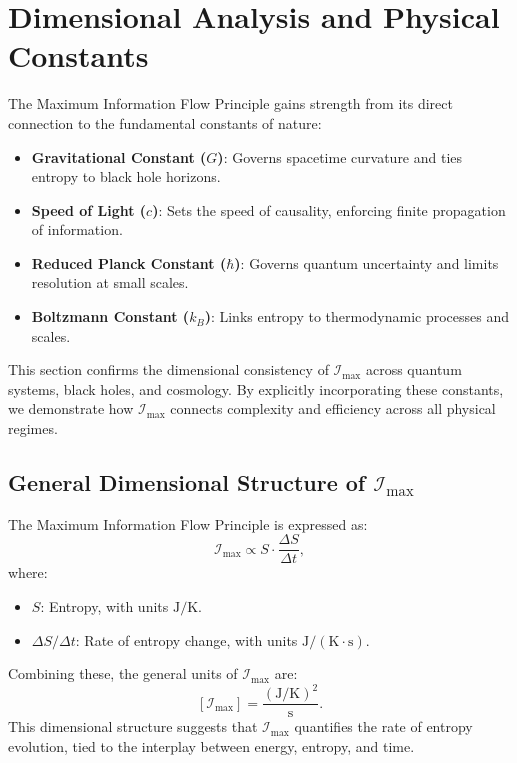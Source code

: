 \documentclass[12pt]{article}
\begin{document}
\section{Dimensional Analysis and Physical Constants}
\label{sec:dimensional_analysis}

The Maximum Information Flow Principle gains strength from its direct connection to the fundamental constants of nature:
\begin{itemize}
    \item \textbf{Gravitational Constant (\( G \))}: Governs spacetime curvature and ties entropy to black hole horizons.
    \item \textbf{Speed of Light (\( c \))}: Sets the speed of causality, enforcing finite propagation of information.
    \item \textbf{Reduced Planck Constant (\( \hbar \))}: Governs quantum uncertainty and limits resolution at small scales.
    \item \textbf{Boltzmann Constant (\( k_B \))}: Links entropy to thermodynamic processes and scales.
\end{itemize}
This section confirms the dimensional consistency of \( \mathcal{I}_{\text{max}} \) across quantum systems, black holes, and cosmology. By explicitly incorporating these constants, we demonstrate how \( \mathcal{I}_{\text{max}} \) connects complexity and efficiency across all physical regimes.

\subsection{General Dimensional Structure of \( \mathcal{I}_{\text{max}} \)}
The Maximum Information Flow Principle is expressed as:
\[
\mathcal{I}_{\text{max}} \propto S \cdot \frac{\Delta S}{\Delta t},
\]
where:
\begin{itemize}
    \item \( S \): Entropy, with units \( \text{J/K} \).
    \item \( \Delta S / \Delta t \): Rate of entropy change, with units \( \text{J}/(\text{K} \cdot \text{s}) \).
\end{itemize}
Combining these, the general units of \( \mathcal{I}_{\text{max}} \) are:
\[
\left[ \mathcal{I}_{\text{max}} \right] = \frac{\left(\text{J}/\text{K}\right)^2}{\text{s}}.
\]
This dimensional structure suggests that \( \mathcal{I}_{\text{max}} \) quantifies the rate of entropy evolution, tied to the interplay between energy, entropy, and time.
\end{document}
